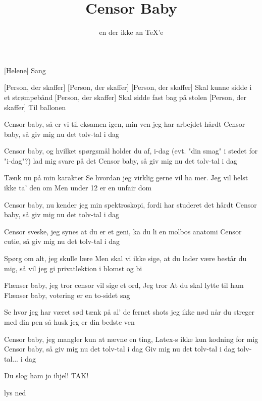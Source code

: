 \documentclass[a4paper,11pt]{article}
\title{Censor Baby}
\author{en der ikke an \TeX'e}
\begin{document}
\maketitle

\begin{roles}
    [Helene] Sang
\end{roles}

\begin{props}
    [Person, der skaffer] 
    [Person, der skaffer] 
    [Person, der skaffer] Skal kunne sidde i et strømpebånd
    [Person, der skaffer] Skal sidde fast bag på stolen
    [Person, der skaffer] Til ballonen
\end{props}

\begin{song}
   Censor baby, så er vi til eksamen igen, min ven
  jeg har arbejdet hårdt
  Censor baby, så giv mig nu det tolv-tal i dag

   Censor baby, og hvilket spørgsmål holder du af, i-dag (evt. "din smag" i stedet for "i-dag"?)
  lad mig svare på det
  Censor baby, så giv mig nu det tolv-tal i dag

  Tænk nu på min karakter
  Se hvordan jeg virklig gerne vil ha mer.
  Jeg vil helst ikke ta' den om
  Men under 12 er en unfair dom

  Censor baby, nu kender jeg min spektroskopi, fordi
  har studeret det hårdt
  Censor baby, så giv mig nu det tolv-tal i dag
  
  Censor sveske, jeg synes at du er et geni, ka du li 
  en molbos anatomi
  Censor cutie, så giv mig nu det tolv-tal i dag

  Spørg om alt, jeg skulle lære
  Men skal vi ikke sige, at du lader være
  består du mig, så vil jeg gi
  privatlektion i blomst og bi

  Flænser baby, jeg tror censor vil sige et ord, Jeg tror
  At du skal lytte til ham
  Flænser baby, votering er en to-sidet sag

  Se hvor jeg har været sød
  tænk på al' de fernet shots jeg ikke nød
  når du streger med din pen
  så husk jeg er din bedste ven

  Censor baby, jeg mangler kun at nævne en ting, Latex-s
  ikke kun kodning for mig
  Censor baby, så giv mig nu det tolv-tal i dag
  Giv mig nu det tolv-tal i dag
  tolv-tal... i dag
 
  Du slog ham jo ihjel! TAK!

  \scene lys ned

\end{song}
\end{document}
